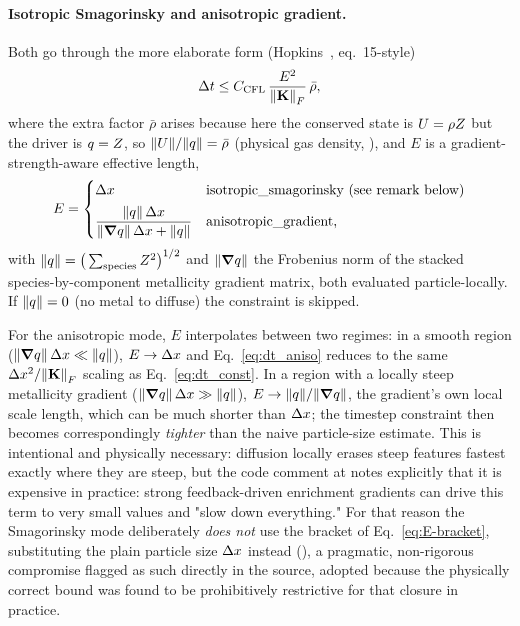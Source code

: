 \paragraph{Isotropic Smagorinsky and anisotropic gradient.}
Both go through the more elaborate form (Hopkins~\citeyear{Hopkins2017diffusion}, eq.~15-style)
\begin{equation}
  \label{eq:dt_aniso}
  \Delta t \le C_{\mathrm{CFL}}\, \frac{E^2}{\norm{\mathbf{K}}_F}\,\bar\rho ,
\end{equation}
where the extra factor $\bar\rho$ arises because here the conserved
state is $U=\rho Z$ but the driver is $q=Z$, so
$\norm{U}/\norm{q} = \bar\rho$ (physical gas density,
), and $E$ is a gradient-strength-aware
effective length,
\begin{equation}
  \label{eq:E-bracket}
  E =
  \begin{cases}
    \Delta x & \text{isotropic\_smagorinsky (see remark below)} \\[4pt]
    \dfrac{\norm{q}\,\Delta x}{\norm{\grad q}\,\Delta x + \norm{q}}
      & \text{anisotropic\_gradient,}
  \end{cases}
\end{equation}
with $\norm{q} = \big(\sum_{\rm species} Z^2\big)^{1/2}$ and
$\norm{\grad q}$ the Frobenius norm of the stacked
species-by-component metallicity gradient matrix, both evaluated
particle-locally. If $\norm{q}=0$ (no metal to diffuse) the
constraint is skipped.

For the anisotropic mode, $E$ interpolates between two regimes: in a
smooth region ($\norm{\grad q}\,\Delta x \ll \norm{q}$),
$E \to \Delta x$ and Eq.~\eqref{eq:dt_aniso} reduces to the same
$\Delta x^2/\norm{\mathbf{K}}_F$ scaling as Eq.~\eqref{eq:dt_const}. In a region
with a locally steep metallicity gradient
($\norm{\grad q}\,\Delta x \gg \norm{q}$),
$E \to \norm{q}/\norm{\grad q}$, the gradient's own local
scale length, which can be much shorter than $\Delta x$; the timestep
constraint then becomes correspondingly \emph{tighter} than the naive
particle-size estimate. This is intentional and physically necessary:
diffusion locally erases steep features fastest exactly where they are
steep, but the code comment at 
notes explicitly that it is expensive in practice: strong feedback-driven
enrichment gradients can drive this term to very small values and
"slow down everything." For that reason the Smagorinsky mode
deliberately \emph{does not} use the bracket of
Eq.~\eqref{eq:E-bracket}, substituting the plain particle size $\Delta x$
instead (), a pragmatic,
non-rigorous compromise flagged as such directly in the source, adopted
because the physically correct bound was found to be prohibitively
restrictive for that closure in practice.

